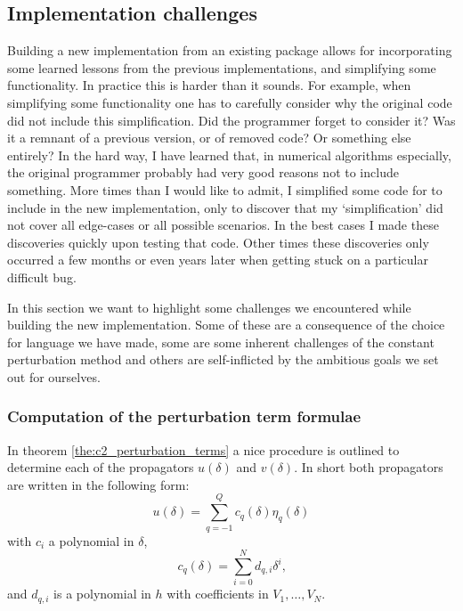 \subsection{Implementation challenges}\label{sec:c2_implementation_challenges}

Building a new implementation from an existing package allows for incorporating some learned lessons from the previous implementations, and simplifying some functionality.  In practice this is harder than it sounds. For example, when simplifying some functionality one has to carefully consider why the original code did not include this simplification. Did the programmer forget to consider it? Was it a remnant of a previous version, or of removed code? Or something else entirely? In the hard way, I have learned that, in numerical algorithms especially, the original programmer probably had very good reasons not to include something. More times than I would like to admit, I simplified some code for  to include in the new implementation, only to discover that my `simplification' did not cover all edge-cases or all possible scenarios. In the best cases I made these discoveries quickly upon testing that code. Other times these discoveries only occurred a few months or even years later when getting stuck on a particular difficult bug.

In this section we want to highlight some challenges we encountered while building the new implementation. Some of these are a consequence of the choice for language we have made, some are some inherent challenges of the constant perturbation method and others are self-inflicted by the ambitious goals we set out for ourselves.



\subsubsection{Computation of the perturbation term formulae}

In theorem \ref{the:c2_perturbation_terms} a nice procedure is outlined to determine each of the propagators $u(\delta)$ and $v(\delta)$. In short both propagators are written in the following form:
$$
    u(\delta) = \sum_{q = -1}^{Q} c_q(\delta) \eta_{q}(\delta)
$$
with $c_i$ a polynomial in $\delta$,
\begin{equation}\label{equ:c2_symbolic_propagators}
    c_q(\delta)  = \sum_{i=0}^{N} d_{q, i} \delta^i\text{,}
\end{equation}
and $d_{q, i}$ is a polynomial in $h$ with coefficients in $V_1, \dots, V_{N}$.

